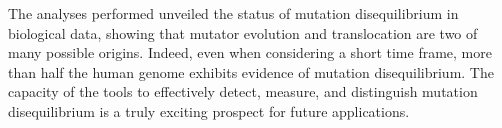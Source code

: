 The analyses performed unveiled the status of mutation disequilibrium in biological data, showing that mutator evolution and translocation are two of many possible origins. Indeed, even when considering a short time frame, more than half the human genome exhibits evidence of mutation disequilibrium. The capacity of the tools to effectively detect, measure, and distinguish mutation disequilibrium is a truly exciting prospect for future applications. 
